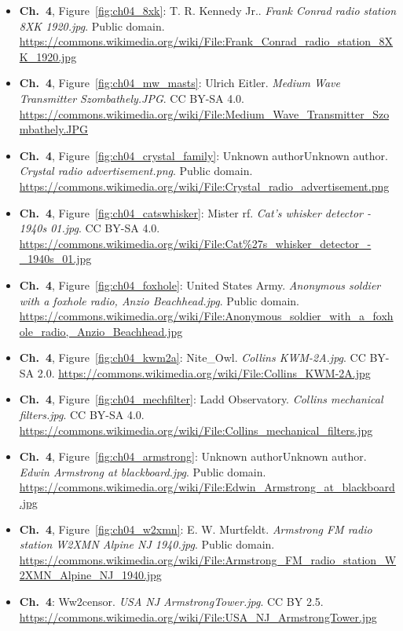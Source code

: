 \begin{small}
\begin{itemize}[leftmargin=0pt,itemsep=2pt,label={}]
\item \textbf{Ch.~4}, Figure~\ref{fig:ch04_8xk}: T. R. Kennedy Jr.. \emph{Frank Conrad radio station 8XK 1920.\allowbreak{}jpg}. Public domain. \url{https://commons.wikimedia.org/wiki/File:Frank_Conrad_radio_station_8XK_1920.jpg}
\item \textbf{Ch.~4}, Figure~\ref{fig:ch04_mw_masts}: Ulrich Eitler. \emph{Medium Wave Transmitter Szombathely.\allowbreak{}JPG}. CC BY-SA 4.0. \url{https://commons.wikimedia.org/wiki/File:Medium_Wave_Transmitter_Szombathely.JPG}
\item \textbf{Ch.~4}, Figure~\ref{fig:ch04_crystal_family}: Unknown authorUnknown author. \emph{Crystal radio advertisement.\allowbreak{}png}. Public domain. \url{https://commons.wikimedia.org/wiki/File:Crystal_radio_advertisement.png}
\item \textbf{Ch.~4}, Figure~\ref{fig:ch04_catswhisker}: Mister rf. \emph{Cat's whisker detector -\allowbreak{} 1940s 01.\allowbreak{}jpg}. CC BY-SA 4.0. \url{https://commons.wikimedia.org/wiki/File:Cat%27s_whisker_detector_-_1940s_01.jpg}
\item \textbf{Ch.~4}, Figure~\ref{fig:ch04_foxhole}: United States Army. \emph{Anonymous soldier with a foxhole radio, Anzio Beachhead.\allowbreak{}jpg}. Public domain. \url{https://commons.wikimedia.org/wiki/File:Anonymous_soldier_with_a_foxhole_radio,_Anzio_Beachhead.jpg}
\item \textbf{Ch.~4}, Figure~\ref{fig:ch04_kwm2a}: Nite\_Owl. \emph{Collins KWM-\allowbreak{}2A.\allowbreak{}jpg}. CC BY-SA 2.0. \url{https://commons.wikimedia.org/wiki/File:Collins_KWM-2A.jpg}
\item \textbf{Ch.~4}, Figure~\ref{fig:ch04_mechfilter}: Ladd Observatory. \emph{Collins mechanical filters.\allowbreak{}jpg}. CC BY-SA 4.0. \url{https://commons.wikimedia.org/wiki/File:Collins_mechanical_filters.jpg}
\item \textbf{Ch.~4}, Figure~\ref{fig:ch04_armstrong}: Unknown authorUnknown author. \emph{Edwin Armstrong at blackboard.\allowbreak{}jpg}. Public domain. \url{https://commons.wikimedia.org/wiki/File:Edwin_Armstrong_at_blackboard.jpg}
\item \textbf{Ch.~4}, Figure~\ref{fig:ch04_w2xmn}: E. W. Murtfeldt. \emph{Armstrong FM radio station W2XMN Alpine NJ 1940.\allowbreak{}jpg}. Public domain. \url{https://commons.wikimedia.org/wiki/File:Armstrong_FM_radio_station_W2XMN_Alpine_NJ_1940.jpg}
\item \textbf{Ch.~4}: Ww2censor. \emph{USA NJ ArmstrongTower.\allowbreak{}jpg}. CC BY 2.5. \url{https://commons.wikimedia.org/wiki/File:USA_NJ_ArmstrongTower.jpg}

\end{itemize}
\end{small}
